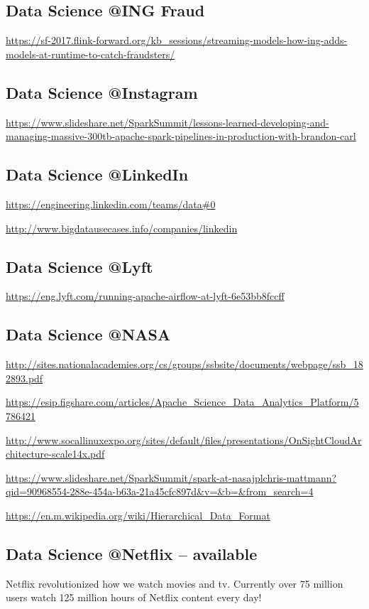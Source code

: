 \documentclass[12pt]{scrartcl} %
\begin{document}
\subsection{Data Science @ING Fraud}
\url{https://sf-2017.flink-forward.org/kb_sessions/streaming-models-how-ing-adds-models-at-runtime-to-catch-fraudsters/}

\subsection{Data Science @Instagram}
\url{https://www.slideshare.net/SparkSummit/lessons-learned-developing-and-managing-massive-300tb-apache-spark-pipelines-in-production-with-brandon-carl}

\subsection{Data Science @LinkedIn}
\url{https://engineering.linkedin.com/teams/data#0}

\url{http://www.bigdatausecases.info/companies/linkedin}

\subsection{Data Science @Lyft}
\url{https://eng.lyft.com/running-apache-airflow-at-lyft-6e53bb8fccff}

\subsection{Data Science @NASA}
\url{http://sites.nationalacademies.org/cs/groups/ssbsite/documents/webpage/ssb_182893.pdf}

\url{https://esip.figshare.com/articles/Apache_Science_Data_Analytics_Platform/5786421}

\url{http://www.socallinuxexpo.org/sites/default/files/presentations/OnSightCloudArchitecture-scale14x.pdf}

\url{https://www.slideshare.net/SparkSummit/spark-at-nasajplchris-mattmann?qid=90968554-288e-454a-b63a-21a45cfc897d&v=&b=&from_search=4}

\url{https://en.m.wikipedia.org/wiki/Hierarchical_Data_Format}

\subsection{Data Science @Netflix -- available}

Netflix revolutionized how we watch movies and tv. Currently over 75 million users watch 125 million hours of Netflix content every day!
\end{document}
